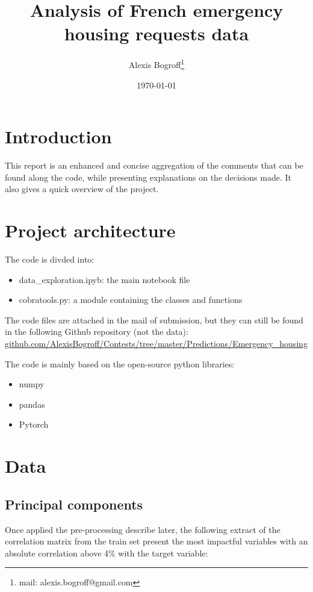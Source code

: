 \documentclass[11pt]{article}
\title{Analysis of French emergency housing requests data}
\date{\today}
\author{Alexis Bogroff\footnote{mail: {alexis.bogroff@gmail.com}}}
\def\wl{\par \vspace{\baselineskip}}
\theoremstyle{definition}
\begin{document}
\maketitle

\section{Introduction}

    This report is an enhanced and concise aggregation of the comments that can be found along the code, while presenting explanations on the decisions made. It also gives a quick overview of the project.

\section{Project architecture}

    The code is divded into:
    \begin{itemize}
        \item data\_exploration.ipyb: the main notebook file
        \item cobratools.py: a module containing the classes and functions
    \end{itemize}

    The code files are attached in the mail of submission, but they can still be found in the following Github repository (not the data):\\
    \href{https://github.com/AlexisBogroff/Contests/tree/master/Predictions/Emergency_housing}{github.com/AlexisBogroff/Contests/tree/master/Predictions/Emergency\_housing}\wl

    The code is mainly based on the open-source python libraries:
    \begin{itemize}
        \item numpy
        \item pandas
        \item Pytorch
    \end{itemize}


\section{Data}

    \subsection{Principal components}

        Once applied the pre-processing describe later, the following extract of the correlation matrix from the train set present the most impactful variables with an absolute correlation above 4\% with the target variable:
\end{document}
